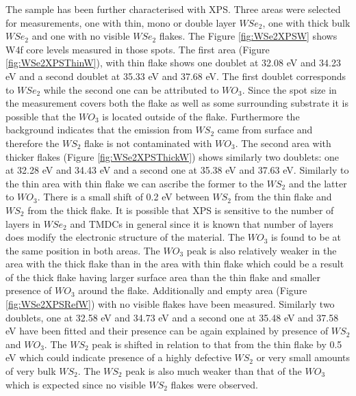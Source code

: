 The sample has been further characterised with XPS. Three areas were selected for measurements, one with thin, mono or double layer $WSe_2$, one with thick bulk $WSe_2$ and one with no visible $WSe_2$ flakes. The Figure \ref{fig:WSe2XPSW} shows W4f core levels measured in those spots. The first area (Figure \ref{fig:WSe2XPSThinW}), with thin flake shows one doublet at 32.08 eV and 34.23 eV and a second doublet at 35.33 eV and 37.68 eV. The first doublet corresponds to $WSe_2$ while the second one can be attributed to $WO_3$. Since the spot size in the measurement covers both the flake as well as some surrounding substrate it is possible that the $WO_3$ is located outside of the flake. Furthermore the background indicates that the emission from $WS_2$ came from surface and therefore the $WS_2$ flake is not contaminated with $WO_3$. 
The second area with thicker flakes (Figure \ref{fig:WSe2XPSThickW}) shows similarly two doublets: one at 32.28 eV and 34.43 eV and a second one at 35.38 eV and 37.63 eV. Similarly to the thin area with thin flake we can ascribe the former to the $WS_2$ and the latter to $WO_3$. There is a small shift of 0.2 eV between $WS_2$ from the thin flake and $WS_2$ from the thick flake. It is possible that XPS is sensitive to the number of layers in $WSe_2$ and TMDCs in general since it is known that number of layers does modify the electronic structure of the material. The $WO_3$ is found to be at the same position in both areas. The $WO_3$ peak is also relatively weaker in the area with the thick flake than in the area with thin flake which could be a result of the thick flake having larger surface area than the thin flake and smaller presence of $WO_3$ around the flake. 
Additionally and empty area (Figure \ref{fig:WSe2XPSRefW}) with no visible flakes have been measured. Similarly two doublets, one at 32.58 eV and 34.73 eV and a second one at 35.48 eV and 37.58 eV have been fitted and their presence can be again explained by presence of $WS_2$ and $WO_3$. The $WS_2$ peak is shifted in relation to that from the thin flake by 0.5 eV which could indicate presence of a highly defective $WS_2$ or very small amounts of very bulk $WS_2$. The $WS_2$ peak is also much weaker than that of the $WO_3$ which is expected since no visible $WS_2$ flakes were observed. 

